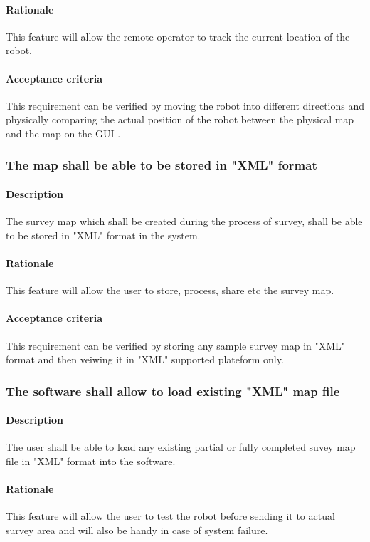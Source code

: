 \documentclass[10pt,a4paper,titlepage]{article}
\begin{document}
    \paragraph{Rationale}   This feature will allow the remote operator to track the current location of the robot. 
    \paragraph{Acceptance criteria}   This requirement can be verified by moving the robot into different directions and physically comparing the actual position of the robot between the physical map and the map on the GUI .
    \subsubsection{The map shall be able to be stored in "XML" format}
     \paragraph{Description}   The survey map which shall be created during the process of survey, shall be able to be stored in "XML" format in the system.
    \paragraph{Rationale}   This feature will allow the user to store, process, share etc the survey map.
    \paragraph{Acceptance criteria}   This requirement can be verified by storing any sample survey map in "XML" format and then veiwing it in "XML" supported plateform only. 
    \subsubsection{The software shall allow to load existing "XML" map file }
     \paragraph{Description}   The user shall be able to load any existing partial or fully completed suvey map file in "XML" format into the software. 
    \paragraph{Rationale}   This feature will allow the user to test the robot before sending it to actual survey area and will also be handy in case of system failure.
\end{document}
